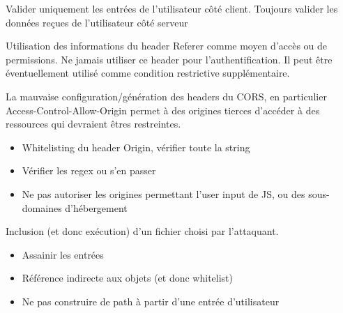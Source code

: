 \documentclass[a4paper]{article}
\begin{document}
\begin{attaque}
    Valider uniquement les entrées de l’utilisateur côté client.
    Toujours valider les données reçues de l’utilisateur côté serveur
\end{attaque}

\begin{attaque}
    Utilisation des informations du header Referer comme moyen d’accès ou de permissions.
    Ne jamais utiliser ce header pour l’authentification. Il peut être éventuellement utilisé comme condition restrictive supplémentaire.
\end{attaque}

\begin{attaque}
    La mauvaise configuration/génération des headers du CORS, en particulier Access-Control-Allow-Origin permet à des origines tierces d’accéder à des ressources qui devraient êtres restreintes.
    \begin{itemize}
        \item Whitelisting du header Origin, vérifier toute la string
        \item Vérifier les regex ou s’en passer
        \item Ne pas autoriser les origines permettant l’user input de JS, ou des sous-domaines d’hébergement
    \end{itemize}
\end{attaque}

\newpage

\begin{attaque}
    Inclusion (et donc exécution) d’un fichier choisi par l’attaquant.
    \begin{itemize}
        \item Assainir les entrées
        \item Référence indirecte aux objets (et donc whitelist)
        \item Ne pas construire de path à partir d’une entrée d’utilisateur
    \end{itemize}
\end{attaque}
\end{document}
